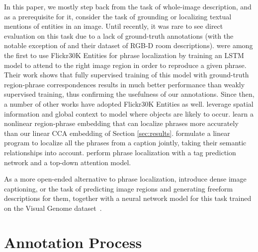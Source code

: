 \documentclass[twocolumn]{svjour3}
\begin{document}
In this paper, we mostly step back from the task of whole-image description, and as a prerequisite for it, consider the task of grounding or localizing textual mentions of entities in an image. Until recently, it was rare to see direct evaluation on this task due to a lack of ground-truth annotations (with the notable exception of \citet{kong2014you} and their dataset of RGB-D room descriptions). \cite{rohrbach2015} were among the first to use Flickr30K Entities for phrase localization by training an LSTM model to attend to the right image region in order to reproduce a given phrase. Their work shows that fully supervised training of this model with ground-truth region-phrase correspondences results in much better performance than weakly supervised training, thus confirming the usefulness of our annotations. Since then, a number of other works have adopted Flickr30K Entities as well. \citet{hu2016natural} leverage spatial information and global context to model where objects are likely to occur. \citet{deepspite2015} learn a nonlinear region-phrase embedding that can localize phrases more accurately than our linear CCA embedding of Section \ref{sec:results}. \citet{wang2016matching} formulate a linear program to localize all the phrases from a caption jointly, taking their semantic relationships into account.  \citet{zhang2016EB} perform phrase localization with a tag prediction network and a top-down attention model.

As a more open-ended alternative to phrase localization, \citet{densecap2015} introduce dense image captioning, or the task of predicting image regions and generating freeform descriptions for them, together with a neural network model for this task trained on the Visual Genome dataset~\citep{krishnavisualgenome}.



\section{Annotation Process} \label{sec:data}
\end{document}
